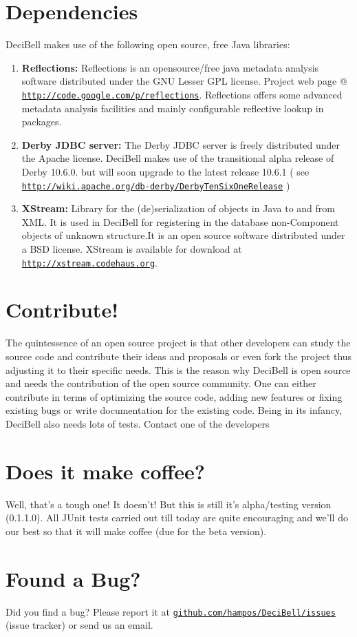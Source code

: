 \documentclass[a4paper,10pt]{article}
\begin{document}
\section*{Dependencies}
DeciBell makes use of the following open source, free Java libraries:
\begin{enumerate}
	\item \textbf{Reflections:} Reflections  is an  opensource/free java metadata  analysis software  distributed under
   	the GNU Lesser GPL license. Project web page @ \href{http://code.google.com/p/reflections}{\texttt{http://code.google.com/p/reflections}}.
	Reflections offers some advanced metadata analysis facilities and mainly configurable reflective lookup
	in packages.
	\item \textbf{Derby JDBC server:}
	The  Derby JDBC server is freely distributed  under the Apache license. DeciBell  makes
	use of the transitional alpha release of Derby 10.6.0. but will soon upgrade to the latest 
	release 10.6.1 ( see \href{http://wiki.apache.org/db-derby/DerbyTenSixOneRelease}{\texttt{http://wiki.apache.org/db-derby/DerbyTenSixOneRelease}} )
	\item \textbf{XStream:}
        Library for the (de)serialization of objects  in Java to and from  XML. It is  used in
   	DeciBell for registering in the database non-Component objects of unknown structure.It
   	is an open source software distributed under a BSD license. XStream is available for
   	download at \href{http://xstream.codehaus.org}{\texttt{http://xstream.codehaus.org}}.


\end{enumerate}

\section*{Contribute!}
The quintessence of an open source project is that other developers can study the source code and contribute
their ideas and proposals or even fork the project thus adjusting it to their specific needs. This is the
reason why DeciBell is open source and needs the contribution of the open source community. One can either 
contribute in terms of optimizing the source code, adding new features or fixing existing bugs or write
documentation for the existing code. Being in its infancy, DeciBell also needs lots of tests. Contact one of the 
developers

\section*{Does it make coffee?}\label{cofee}
Well, that's a tough one! It doesn't! But this is still it's alpha/testing version (0.1.1.0). All JUnit tests
carried out till today are quite encouraging and we'll do our best so that it will make 
coffee (due for the beta version).

\section*{Found a Bug?}\label{bug}
Did you find a bug? 
Please report it at \href{issues http://github.com/hampos/DeciBell/issues}{\texttt{github.com/hampos/DeciBell/issues}} (issue
tracker) or send us an email. 
\end{document}
